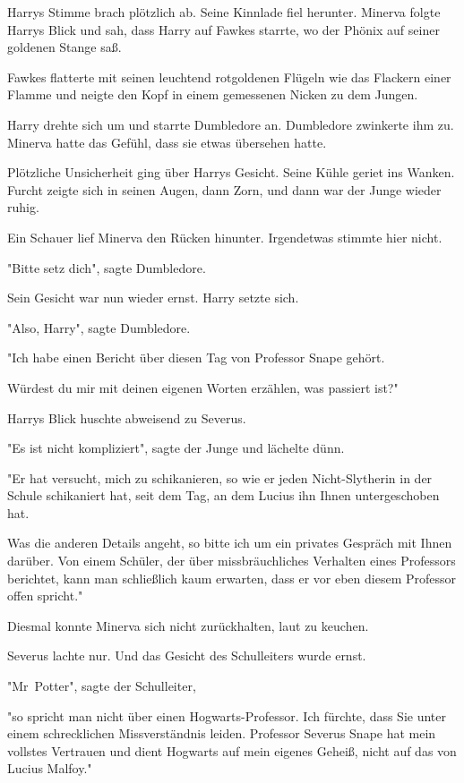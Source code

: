{Harrys Stimme brach plötzlich ab. Seine Kinnlade fiel herunter. Minerva folgte Harrys Blick und sah, dass Harry auf Fawkes starrte, wo der Phönix auf seiner goldenen Stange saß.

Fawkes flatterte mit seinen leuchtend rotgoldenen Flügeln wie das Flackern einer Flamme und neigte den Kopf in einem gemessenen Nicken zu dem Jungen.

Harry drehte sich um und starrte Dumbledore an. Dumbledore zwinkerte ihm zu. Minerva hatte das Gefühl, dass sie etwas übersehen hatte.

Plötzliche Unsicherheit ging über Harrys Gesicht. Seine Kühle geriet ins Wanken. Furcht zeigte sich in seinen Augen, dann Zorn, und dann war der Junge wieder ruhig.

Ein Schauer lief Minerva den Rücken hinunter. Irgendetwas stimmte hier nicht.

"Bitte setz dich", sagte Dumbledore.

Sein Gesicht war nun wieder ernst. Harry setzte sich.

"Also, Harry", sagte Dumbledore.

"Ich habe einen Bericht über diesen Tag von Professor Snape gehört.

Würdest du mir mit deinen eigenen Worten erzählen, was passiert ist?"

Harrys Blick huschte abweisend zu Severus.

"Es ist nicht kompliziert", sagte der Junge und lächelte dünn.

"Er hat versucht, mich zu schikanieren, so wie er jeden Nicht-Slytherin in der Schule schikaniert hat, seit dem Tag, an dem Lucius ihn Ihnen untergeschoben hat.

Was die anderen Details angeht, so bitte ich um ein privates Gespräch mit Ihnen darüber. Von einem Schüler, der über missbräuchliches Verhalten eines Professors berichtet, kann man schließlich kaum erwarten, dass er vor eben diesem Professor offen spricht."

Diesmal konnte Minerva sich nicht zurückhalten, laut zu keuchen.

Severus lachte nur. Und das Gesicht des Schulleiters wurde ernst.

"Mr~Potter", sagte der Schulleiter,

"so spricht man nicht über einen Hogwarts-Professor. Ich fürchte, dass Sie unter einem schrecklichen Missverständnis leiden. Professor Severus Snape hat mein vollstes Vertrauen und dient Hogwarts auf mein eigenes Geheiß, nicht auf das von Lucius Malfoy."

}
